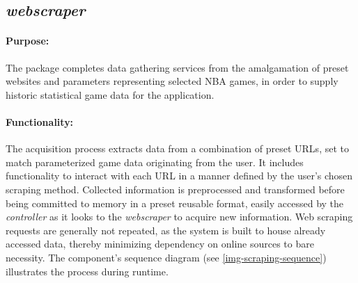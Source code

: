 \documentclass{thesis-ekf}
\theoremstyle{definition}
\theoremstyle{remark}
\begin{document}
{\subsection{\emph{webscraper}}
\paragraph{Purpose:}
The package completes data gathering services from the amalgamation of preset websites and parameters representing selected NBA games, in order to supply historic statistical game data for the application.
\paragraph{Functionality:}
The acquisition process extracts data from a combination of preset URLs, set to match parameterized game data originating from the user. It includes functionality to interact with each URL in a manner defined by the user's chosen scraping method. Collected information is preprocessed and transformed before being committed to memory in a preset reusable format, easily accessed by the \emph{controller} as it looks to the \emph{webscraper} to acquire new information. Web scraping requests are generally not repeated, as the system is built to house already accessed data, thereby minimizing dependency on online sources to bare necessity. The component's sequence diagram (see \ref{img-scraping-sequence}) illustrates the process during runtime.
}
\end{document}
